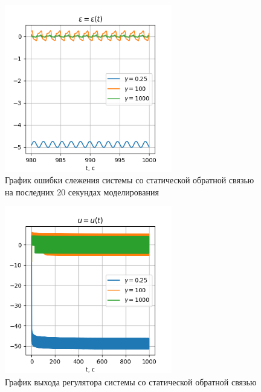 \documentclass{article}
\begin{document}
\begin{figure}[h!]
  \centering
  \includegraphics[width=0.65\textwidth]{figs/2_epsilon_small.png}
  \caption{График ошибки слежения системы со статической обратной связью на последних 20 секундах моделирования} 
  \label{fig:task1_y}
\end{figure}

\begin{figure}[h!]
  \centering
  \includegraphics[width=0.65\textwidth]{figs/2_u.png}
  \caption{График выхода регулятора системы со статической обратной связью} 
  \label{fig:task1_y}
\end{figure}
\end{document}
